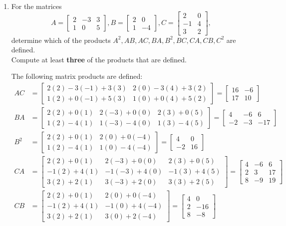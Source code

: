 \documentclass[12pt]{article}
\newcommand{\bbm}{\begin{bmatrix}}
\newcommand{\ebm}{\end{bmatrix}}
\begin{document}
\thispagestyle{fancy}
 \begin{enumerate}
 
\item For the matrices
\[
 A = \bbm 2&-3&3\\1&0&5\ebm, B = \bbm 2&0\\1&-4\ebm, C = \bbm 2&0\\-1&4\\3&2\ebm,
\]
determine which of the products $A^2, AB, AC, BA, B^2, BC, CA, CB, C^2$ are defined.\\
Compute at least {\bf three} of the products that are defined.\\

\bigskip

The following matrix products are defined:
\begin{align*}
 AC&=\bbm 2(2)-3(-1)+3(3)&2(0)-3(4)+3(2)\\1(2)+0(-1)+5(3)&1(0)+0(4)+5(2)\ebm = \bbm 16&-6\\17&10\ebm\\[12pt]
 BA&=\bbm 2(2)+0(1)&2(-3)+0(0)&2(3)+0(5)\\1(2)-4(1)&1(-3)-4(0)&1(3)-4(5)\ebm = \bbm 4&-6&6\\-2&-3&-17\ebm\\[12pt]
 B^2&=\bbm 2(2)+0(1)&2(0)+0(-4)\\1(2)-4(1)&1(0)-4(-4)\ebm = \bbm 4&0\\-2&16\ebm\\[12pt]
 CA&=\bbm 2(2)+0(1)&2(-3)+0(0)&2(3)+0(5)\\-1(2)+4(1)&-1(-3)+4(0)&-1(3)+4(5)\\3(2)+2(1)&3(-3)+2(0)&3(3)+2(5)\ebm = \bbm 4&-6&6\\2&3&17\\8&-9&19\ebm\\[12pt]
 CB&=\bbm 2(2)+0(1)&2(0)+0(-4)\\-1(2)+4(1)&-1(0)+4(-4)\\3(2)+2(1)&3(0)+2(-4)\ebm = \bbm 4&0\\2&-16\\8&-8\ebm
\end{align*}


\bigskip

\bigskip


\end{enumerate}
\end{document}
